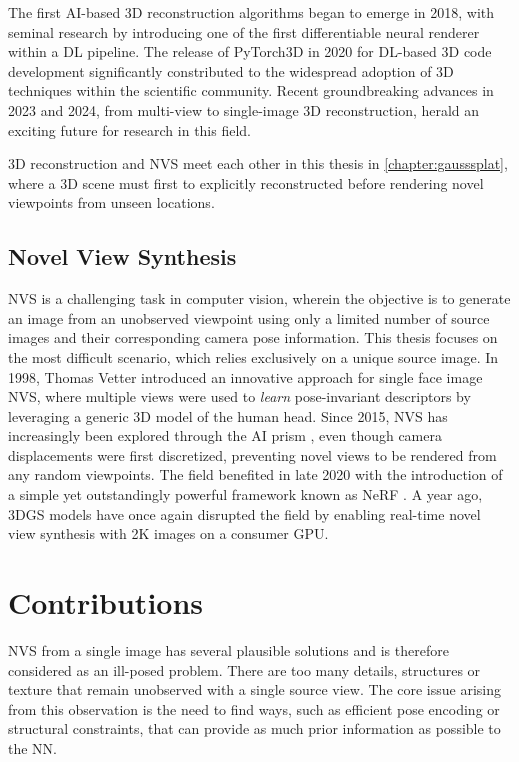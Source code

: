 The first \ac{AI}-based 3D reconstruction algorithms began to emerge in 2018, with seminal research by \citep{kato2018neural} introducing one of the first differentiable neural renderer within a \ac{DL} pipeline. The release of PyTorch3D \citep{ravi2020pytorch3d} in 2020 for \ac{DL}-based 3D code development significantly constributed to the widespread adoption of 3D techniques within the scientific community. Recent groundbreaking advances in 2023 and 2024, from multi-view \citep{li2023neuralangelo} to single-image \citep{voleti2024sv3d} 3D reconstruction, herald an exciting future for research in this field.

3D reconstruction and \ac{NVS} meet each other in this thesis in \autoref{chapter:gausssplat}, where a 3D scene must first to explicitly reconstructed before rendering novel viewpoints from unseen locations. 

\subsection{Novel View Synthesis}
\ac{NVS} is a challenging task in computer vision, wherein the objective is to generate an image from an unobserved viewpoint using only a limited number of source images and their corresponding camera pose information. This thesis focuses on the most difficult scenario, which relies exclusively on a unique source image. In 1998, Thomas Vetter introduced an innovative approach \citep{vetter1998synthesis} for single face image \ac{NVS}, where multiple views were used to \textit{learn} pose-invariant descriptors by leveraging a generic 3D model of the human head. Since 2015, \ac{NVS} has increasingly been explored through the \ac{AI} prism \citep{yang2015weakly}, even though camera displacements were first discretized, preventing novel views to be rendered from any random viewpoints. The field benefited in late 2020 with the introduction of a simple yet outstandingly powerful framework known as \ac{NeRF} \citep{mildenhall2020nerf}. A year ago, 3D\ac{GS} models have once again disrupted the field by enabling real-time novel view synthesis with 2K  images on a consumer \ac{GPU}. 


\section{Contributions}
\ac{NVS} from a single image has several plausible solutions and is therefore considered as an ill-posed problem. There are too many details, structures or texture that remain unobserved with a single source view. The core issue arising from this observation is the need to find ways, such as efficient pose encoding or structural constraints, that can provide as much prior information as possible to the \ac{NN}. 

